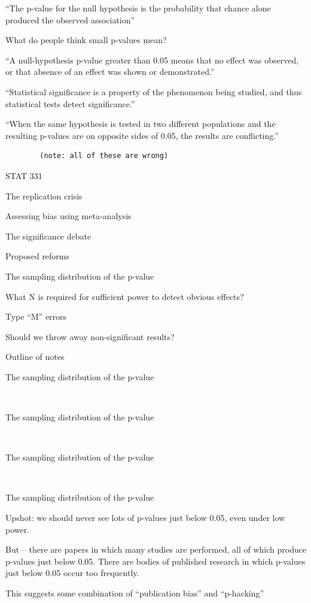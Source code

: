 \documentclass[
  letterpaper,
  DIV=11,
  numbers=noendperiod]{scrreprt}
\begin{document}
``The p-value for the null hypothesis is the probability that chance
alone produced the observed association''

What do people think small p-values mean?

``A null-hypothesis p-value greater than 0.05 means that no effect was
observed, or that absence of an effect was shown or demonstrated.''

``Statistical significance is a property of the phenomenon being
studied, and thus statistical tests detect significance.''

``When the same hypothesis is tested in two different populations and
the resulting p-values are on opposite sides of 0.05, the results are
conflicting.''

\begin{verbatim}
        (note: all of these are wrong)
\end{verbatim}

STAT 331

The replication crisis

Assessing bias using meta-analysis

The significance debate

Proposed reforms

The sampling distribution of the p-value

What N is required for sufficient power to detect obvious effects?

Type ``M'' errors

Should we throw away non-significant results?

Outline of notes

The sampling distribution of the p-value

~

The sampling distribution of the p-value

~

The sampling distribution of the p-value

~

The sampling distribution of the p-value

Upshot: we should never see lots of p-values just below 0.05, even under
low power. 

But -- there are papers in which many studies are performed, all of
which produce p-values just below 0.05. There are bodies of published
research in which p-values just below 0.05 occur too frequently.

This suggests some combination of ``publication bias'' and ``p-hacking''
\end{document}
